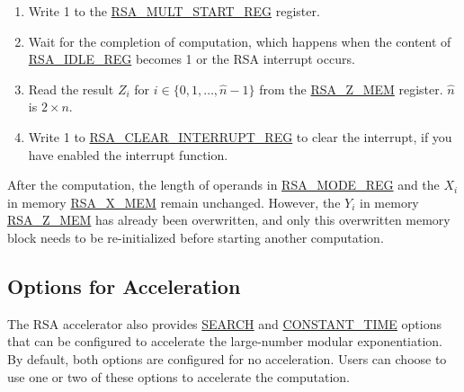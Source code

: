 \documentclass[main\_\_EN.tex]{subfiles}
\begin{document}
\begin{enumerate}
        Users need to write data to each memory block only according to the length of the number; data beyond this length are ignored.

    \item Write 1 to the \hyperref[regdesc:RSAMULTSTARTREG]{RSA\_MULT\_START\_REG} register.

    \item Wait for the completion of computation, which happens when the content of \hyperref[regdesc:RSAIDLEREG]{RSA\_IDLE\_REG} becomes 1 or the RSA interrupt occurs.

    \item Read the result \begin{math}Z_{i}\end{math}
          for \begin{math}i \in \{ 0, 1, \dots, \hat{n}-1 \} \end{math} from the \hyperref[regdesc:RSAmemory]{RSA\_Z\_MEM} register.
        \begin{math}\hat{n}\end{math} is \begin{math} 2 \times n \end{math}.

    \item Write 1 to \hyperref[regdesc:RSACLEARINTERRUPTREG]{RSA\_CLEAR\_INTERRUPT\_REG} to clear the interrupt, if you have enabled the interrupt function.

\end{enumerate}

After the computation, the length of operands in \hyperref[regdesc:RSAMODEXPMODEREG]{RSA\_MODE\_REG} and the \begin{math}X_{i}\end{math} in memory \hyperref[regdesc:RSAmemory]{RSA\_X\_MEM} remain unchanged. However, the \begin{math}{Y}_{i}\end{math} in memory \hyperref[regdesc:RSAmemory]{RSA\_Z\_MEM} has already been overwritten, and only this overwritten memory block needs to be re-initialized before starting another computation.

\subsection{Options for Acceleration} \label{sec:Accelerate options}

The \chipname{} RSA accelerator also provides \hyperref[regdesc:RSASEARCHENABLEREG]{SEARCH} and \hyperref[regdesc:RSACONSTANTTIMEREG]{CONSTANT\_TIME} options that can be configured to accelerate the large-number modular exponentiation. By default, both options are configured for no acceleration. Users can choose to use one or two of these options to accelerate the computation.
\end{document}

